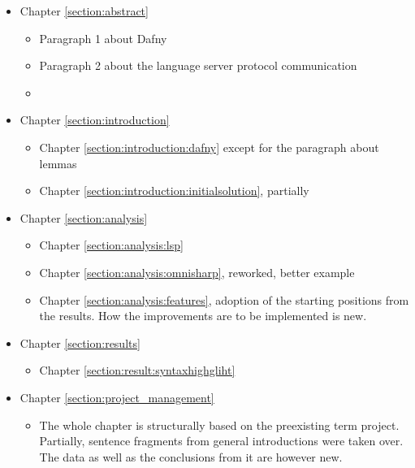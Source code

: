 \begin{itemize}
    \item Chapter \ref{section:abstract} 
        \begin{itemize}
            \item Paragraph 1 about Dafny
            \item Paragraph 2 about the language server protocol communication
            \item  {}
        \end{itemize}
    \item Chapter \ref{section:introduction} 
        \begin{itemize}
            \item Chapter \ref{section:introduction:dafny} except for the paragraph about lemmas
            \item Chapter \ref{section:introduction:initialsolution}, partially
        \end{itemize}

    \item Chapter \ref{section:analysis} 
        \begin{itemize}
            \item Chapter \ref{section:analysis:lsp}
            \item Chapter \ref{section:analysis:omnisharp}, reworked, better example
            \item Chapter \ref{section:analysis:features}, adoption of the starting positions from the results. How the improvements are to be implemented is new.
        \end{itemize}

    \item Chapter \ref{section:results} 
        \begin{itemize}
            \item Chapter \ref{section:result:syntaxhighgliht}
        \end{itemize}

    \item Chapter \ref{section:project_management} 
        \begin{itemize}
            \item The whole chapter is structurally based on the preexisting term project.
            Partially, sentence fragments from general introductions were taken over.
            The data as well as the conclusions from it are however new.
        \end{itemize}


\end{itemize}
